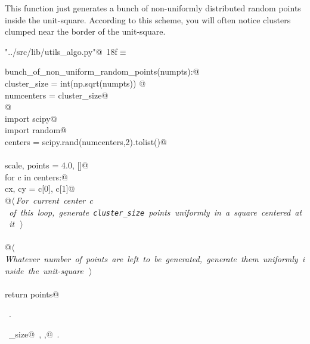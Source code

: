 \documentclass[11.5pt]{report}
\begin{document}
\vspace{-0.8cm} \newchunk This function just generates a bunch of non-uniformly distributed
random points inside the unit-square. According to this scheme, you will often notice
clusters clumped near the border of the unit-square. 
\begin{flushleft} \small\label{scrap18}\raggedright\small
{} \verb@"../src/lib/utils_algo.py"@\nobreak\ {\footnotesize {18f}}$\equiv$
\vspace{-1ex}
\begin{list}{}{} \item
\mbox{}\verb@def bunch_of_non_uniform_random_points(numpts):@\\
\mbox{}\verb@    cluster_size = int(np.sqrt(numpts)) @\\
\mbox{}\verb@    numcenters   = cluster_size@\\
\mbox{}\verb@    @\\
\mbox{}\verb@    import scipy@\\
\mbox{}\verb@    import random@\\
\mbox{}\verb@    centers = scipy.rand(numcenters,2).tolist()@\\
\mbox{}\verb@@\\
\mbox{}\verb@    scale, points = 4.0, []@\\
\mbox{}\verb@    for c in centers:@\\
\mbox{}\verb@        cx, cy = c[0], c[1]@\\
\mbox{}\verb@        @\hbox{$\langle\,${\itshape For current center $c$ of this loop, generate \verb|cluster_size| points uniformly in a square centered at it}\nobreak\ {\footnotesize {}}$\,\rangle$}\verb@@\\
\mbox{}\verb@@\\
\mbox{}\verb@    @\hbox{$\langle\,${\itshape Whatever number of points are left to be generated, generate them uniformly inside the unit-square}\nobreak\ {\footnotesize {}}$\,\rangle$}\verb@@\\
\mbox{}\verb@@\\
\mbox{}\verb@    return points@\\
\mbox{}\verb@@{\NWsep}
\end{list}
\vspace{-1.5ex}
\footnotesize
\begin{list}{}{\setlength{\itemsep}{-\parsep}\setlength{\itemindent}{-\leftmargin}}
\item \NWtxtFileDefBy\ .
\item \NWtxtIdentsDefed\nobreak\  \verb@cluster_size@\nobreak\ , \verb@scale,@\nobreak\ .
\item{}
\end{list}
\vspace{4ex}
\end{flushleft}
\end{document}
